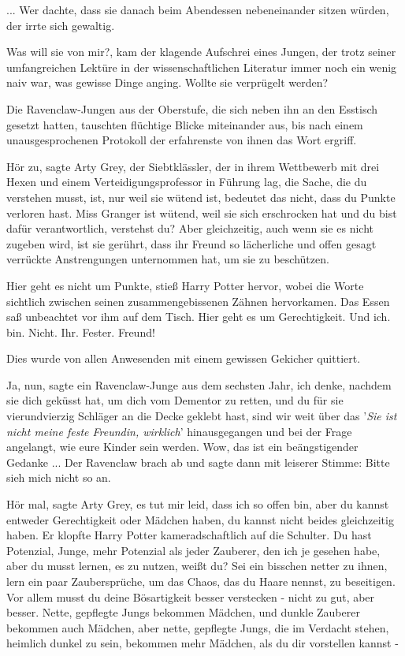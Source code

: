 ... Wer dachte, dass sie danach beim Abendessen nebeneinander sitzen würden, der
irrte sich gewaltig.

\glqq Was will sie von mir?\grqq{}, kam der klagende Aufschrei eines Jungen, der
trotz seiner umfangreichen Lektüre in der wissenschaftlichen Literatur immer
noch ein wenig naiv war, was gewisse Dinge anging. \glqq Wollte sie verprügelt
werden?\grqq{}

Die Ravenclaw-Jungen aus der Oberstufe, die sich neben ihn an den Esstisch
gesetzt hatten, tauschten flüchtige Blicke miteinander aus, bis nach einem
unausgesprochenen Protokoll der erfahrenste von ihnen das Wort ergriff.

\glqq Hör zu\grqq{}, sagte Arty Grey, der Siebtklässler, der in ihrem Wettbewerb
mit drei Hexen und einem Verteidigungsprofessor in Führung lag, \glqq die Sache,
die du verstehen musst, ist, nur weil sie wütend ist, bedeutet das nicht, dass
du Punkte verloren hast. Miss Granger ist wütend, weil sie sich erschrocken hat
und du bist dafür verantwortlich, verstehst du? Aber gleichzeitig, auch wenn sie
es nicht zugeben wird, ist sie gerührt, dass ihr Freund so lächerliche und offen
gesagt verrückte Anstrengungen unternommen hat, um sie zu beschützen.\grqq{}

\glqq Hier geht es nicht um Punkte\grqq{}, stieß Harry Potter hervor, wobei die
Worte sichtlich zwischen seinen zusammengebissenen Zähnen hervorkamen. Das Essen
saß unbeachtet vor ihm auf dem Tisch. \glqq Hier geht es um Gerechtigkeit. Und
ich. bin. Nicht. Ihr. Fester. Freund!\grqq{}

Dies wurde von allen Anwesenden mit einem gewissen Gekicher quittiert.

\glqq Ja, nun\grqq{}, sagte ein Ravenclaw-Junge aus dem sechsten Jahr, \glqq ich
denke, nachdem sie dich geküsst hat, um dich vom Dementor zu retten, und du für
sie vierundvierzig Schläger an die Decke geklebt hast, sind wir weit über das
'\emph{Sie ist nicht meine feste Freundin, wirklich}' hinausgegangen und bei der
Frage angelangt, wie eure Kinder sein werden. Wow, das ist ein beängstigender
Gedanke ...\grqq{} Der Ravenclaw brach ab und sagte dann mit leiserer Stimme:
\glqq Bitte sieh mich nicht so an.\grqq{}

\glqq Hör mal\grqq{}, sagte Arty Grey, \glqq es tut mir leid, dass ich so offen
bin, aber du kannst entweder Gerechtigkeit oder Mädchen haben, du kannst nicht
beides gleichzeitig haben.\grqq{} Er klopfte Harry Potter kameradschaftlich auf
die Schulter. \glqq Du hast Potenzial, Junge, mehr Potenzial als jeder Zauberer,
den ich je gesehen habe, aber du musst lernen, es zu nutzen, weißt du? Sei ein
bisschen netter zu ihnen, lern ein paar Zaubersprüche, um das Chaos, das du
Haare nennst, zu beseitigen. Vor allem musst du deine Bösartigkeit besser
verstecken - nicht zu gut, aber besser. Nette, gepflegte Jungs bekommen Mädchen,
und dunkle Zauberer bekommen auch Mädchen, aber nette, gepflegte Jungs, die im
Verdacht stehen, heimlich dunkel zu sein, bekommen mehr Mädchen, als du dir
vorstellen kannst -\grqq{}

